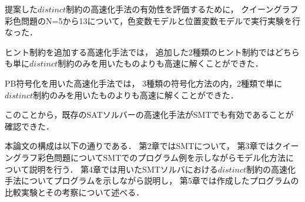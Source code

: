 提案した$distinct$制約の高速化手法の有効性を評価するために，
クイーングラフ彩色問題のN=5から13について，色変数モデルと位置変数モデルで実行実験を行なった．

ヒント制約を追加する高速化手法では，
追加した2種類のヒント制約ではどちらも単に$distinct$制約のみを用いたものよりも高速に解くことができた．

PB符号化を用いた高速化手法では，
3種類の符号化方法の内，2種類で単に$distinct$制約のみを用いたものよりも高速に解くことができた．


このことから，既存のSATソルバーの高速化手法がSMTでも有効であることが確認できた．


本論文の構成は以下の通りである．
第2章ではSMTについて，
第3章ではクイーングラフ彩色問題についてSMTでのプログラム例を示しながらモデル化方法について説明を行う．
第4章では用いたSMTソルバにおける$distinct$制約の高速化手法についてプログラムを示しながら説明し，
第5章では作成したプログラムの比較実験とその考察について述べる．

